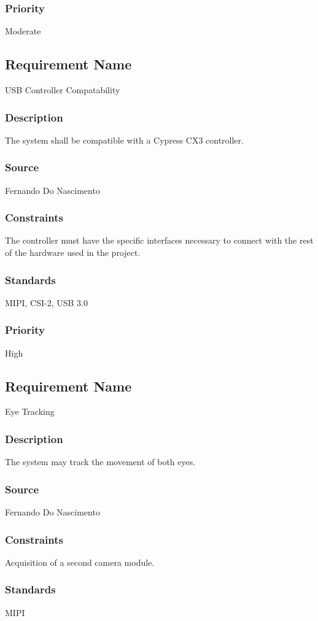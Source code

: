 \subsubsection{Priority}
Moderate

\subsection{Requirement Name}
USB Controller Compatability
\subsubsection{Description}
The system shall be compatible with a Cypress CX3 controller.
\subsubsection{Source}
Fernando Do Nascimento
\subsubsection{Constraints}
The controller must have the specific interfaces necessary to connect with the rest of the hardware used in the project.
\subsubsection{Standards}
MIPI, CSI-2, USB 3.0
\subsubsection{Priority}
High

\subsection{Requirement Name}
Eye Tracking
\subsubsection{Description}
The system may track the movement of both eyes.
\subsubsection{Source}
Fernando Do Nascimento
\subsubsection{Constraints}
Acquisition of a second camera module.
\subsubsection{Standards}
MIPI
